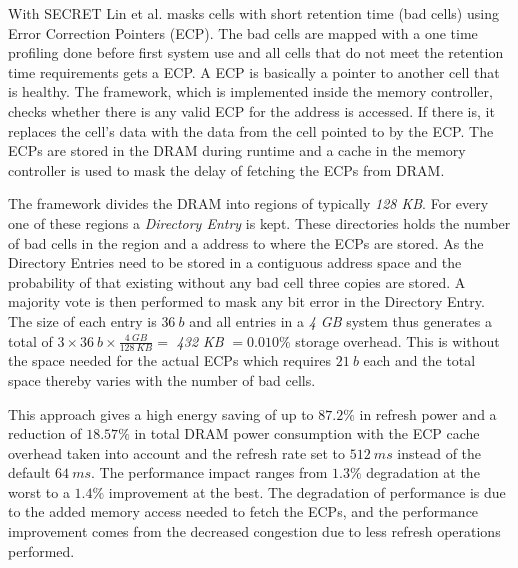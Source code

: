 With SECRET Lin et al. \cite{secret} masks cells with short retention time (bad cells) using Error Correction Pointers (ECP). The bad cells are mapped with a one time profiling done before first system use and all cells that do not meet the retention time requirements gets a ECP. A ECP is basically a pointer to another cell that is healthy. The framework, which is implemented inside the memory controller, checks whether there is any valid ECP for the address is accessed. If there is, it replaces the cell's data with the data from the cell pointed to by the ECP. The ECPs are stored in the DRAM during runtime and a cache in the memory controller is used to mask the delay of fetching the ECPs from DRAM.

The framework divides the DRAM into regions of typically \textit{128 KB}. For every one of these regions a \textit{Directory Entry} is kept. These directories holds the number of bad cells in the region and a address to where the ECPs are stored. As the Directory Entries need to be stored in a contiguous address space and the probability of that existing without any bad cell three copies are stored. A majority vote is then performed to mask any bit error in the Directory Entry. The size of each entry is $36\:b$ and all entries in a \textit{4 GB} system thus generates a total of $3 \times 36\:b \times \frac{4\:GB}{128\:KB} =$ \textit{432 KB} $= 0.010\%$ storage overhead. This is without the space needed for the actual ECPs which requires $21\:b$ each and the total space thereby varies with the number of bad cells.      

This approach gives a high energy saving of up to $87.2\%$ in refresh power and a reduction of $18.57\%$ in total DRAM power consumption with the ECP cache overhead taken into account and the refresh rate set to $512\:ms$ instead of the default $64\:ms$. The performance impact ranges from $1.3\%$ degradation at the worst to a $1.4\%$ improvement at the best. The degradation of performance is due to the added memory access needed to fetch the ECPs, and the performance improvement comes from the decreased congestion due to less refresh operations performed.